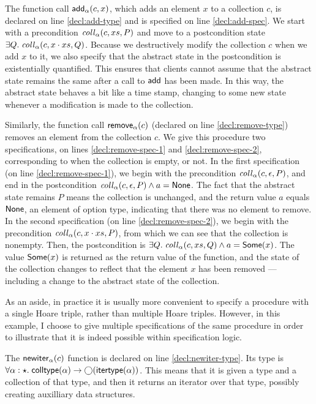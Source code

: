 The function call $\mathsf{add}_\alpha(c, x)$, which adds an element $x$
to a collection $c$, is declared on line \ref{decl:add-type} and is
specified on line \ref{decl:add-spec}. We start with a precondition
$\mathit{coll}_\alpha(c, xs, P)$ and move to a postcondition state
$\exists Q.\; \mathit{coll}_\alpha(c, x\cdot xs, Q)$. Because we
destructively modify the collection $c$ when we add $x$ to it, we also
specify that the abstract state in the postcondition is existentially
quantified. This ensures that clients cannot assume that the abstract
state remains the same after a call to $\mathsf{add}$ has been made. In
this way, the abstract state behaves a bit like a time stamp, changing
to some new state whenever a modification is made to the collection. 

Similarly, the function call $\mathsf{remove}_\alpha(c)$ (declared on
line \ref{decl:remove-type}) removes an element from the collection
$c$. We give this procedure two specifications, on lines
\ref{decl:remove-spec-1} and \ref{decl:remove-spec-2}, corresponding
to when the collection is empty, or not.  In the first specification
(on line \ref{decl:remove-spec-1}), we begin with the precondition
$\mathit{coll}_\alpha(c, \epsilon, P)$, and end in the postcondition
$\mathit{coll}_\alpha(c, \epsilon, P) \land a = \mathsf{None}$. The fact that the
abstract state remains $P$ means the collection is unchanged, and the
return value $a$ equals $\mathsf{None}$, an element of option type, indicating
that there was no element to remove.  In the second specification (on
line \ref{decl:remove-spec-2}), we begin with the precondition
$\mathit{coll}_\alpha(c, x\cdot xs, P)$, from which we can see that the
collection is nonempty. Then, the postcondition is $\exists Q.\;
\mathit{coll}_\alpha(c, xs, Q) \land a = \mathsf{Some}(x)$.  The value $\mathsf{Some}(x)$
is returned as the return value of the function, and the state of the
collection changes to reflect that the element $x$ has been removed
--- including a change to the abstract state of the collection.

As an aside, in practice it is usually more convenient to specify a
procedure with a single Hoare triple, rather than multiple Hoare
triples. However, in this example, I choose to give multiple
specifications of the same procedure in order to illustrate that it is
indeed possible within specification logic.

The $\mathsf{newiter}_\alpha(c)$ function is declared on line
\ref{decl:newiter-type}.  Its type is $\forall \alpha:\star.\;
\mathsf{colltype}(\alpha) \to \bigcirc{(\mathsf{itertype}(\alpha))}$.  This means that
it is given a type and a collection of that type, and then it returns
an iterator over that type, possibly creating auxilliary data structures.

